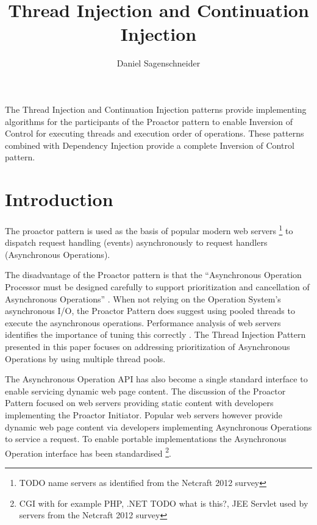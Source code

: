 \documentclass{article}
\begin{document}
\title{Thread Injection and Continuation Injection}
\author{Daniel Sagenschneider}
\date{}
\maketitle

\abstract{}
The Thread Injection and Continuation Injection patterns provide implementing
algorithms for the participants of the Proactor pattern to enable Inversion of
Control for executing threads and execution order of operations.  These patterns
combined with Dependency Injection provide a complete Inversion of Control
pattern.

\section{Introduction}

The proactor pattern \cite{proactor} is used as the basis of popular modern web
servers \footnote{TODO name servers as identified from the Netcraft 2012 survey}
to dispatch request handling (events) asynchronously to request handlers
(Asynchronous Operations).

The disadvantage of the Proactor pattern is that the ``Asynchronous Operation
Processor must be designed carefully to support prioritization and cancellation
of Asynchronous Operations'' \cite{proactor}.  When not relying on the Operation
System's asynchronous I/O, the Proactor Pattern does suggest using pooled
threads to execute the asynchronous operations.  Performance analysis of web
servers identifies the importance of tuning this correctly
\cite{tuning-important,tuning-os-important,low-server-footprint}.  The Thread
Injection Pattern presented in this paper focuses on addressing prioritization
of Asynchronous Operations by using multiple thread pools.

The Asynchronous Operation API has also become a single standard interface to
enable servicing dynamic web page content.  The discussion of the Proactor
Pattern focused on web servers providing static content with developers
implementing the Proactor Initiator.  Popular web servers however provide
dynamic web page content via developers implementing Asynchronous Operations to
service a request.  To enable portable implementations the Asynchronous
Operation interface has been standardised \footnote{CGI with for example PHP,
.NET TODO what is this?, JEE Servlet used by servers from the Netcraft 2012
survey}.
\end{document}
